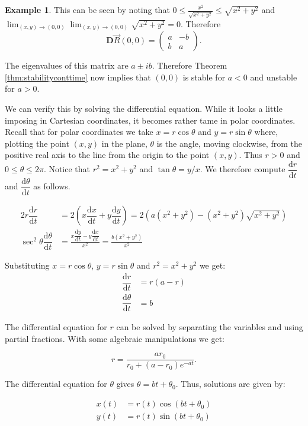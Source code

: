 \documentclass[
  a4paper,
  oneside,
  final]{krantz}
\renewcommand{\d}{\mathrm{d}}
\newcommand{\der}[2]{\dfrac{\d #1}{\d #2}}
\newcommand{\jacobr}{\mathbf{D}\vec{R}}
\theoremstyle{definition}
\theoremstyle{definition}
\newtheorem{example}{Example}[chapter]
\theoremstyle{definition}
\theoremstyle{definition}
\theoremstyle{remark}
\begin{document}
\begin{example}
This can be seen by noting that \(0 \le \frac{x^2}{\sqrt{x^2 + y^2}} \le \sqrt{x^2 + y^2}\) and \(\lim_{(x,y) \to (0,0)} \lim_{(x,y) \to (0,0)} \sqrt{x^2 + y^2} = 0\). Therefore \[
\jacobr(0,0) = \begin{pmatrix} a   & -b \\ b  & a \end{pmatrix}
.\]

The eigenvalues of this matrix are \(a \pm i b\). Therefore Theorem \ref{thm:stabilityconttime} now implies that \((0,0)\) is stable for \(a < 0\) and unstable for \(a >0\).

We can verify this by solving the differential equation. While it looks a little imposing in Cartesian coordinates, it becomes rather tame in polar coordinates. Recall that for polar coordinates we take \(x = r \cos \theta\) and \(y= r \sin \theta\) where, plotting the point \((x,y)\) in the plane, \(\theta\) is the angle, moving clockwise, from the positive real axis to the line from the origin to the point \((x,y)\). Thus \(r>0\) and \(0 \le \theta \le 2 \pi\). Notice that \(r^2 = x^2 + y^2\) and \(\tan \theta = y/x\). We therefore compute \(\der{r}{t}\) and \(\der{\theta}{t}\) as follows.

\begin{align*}
2r\der{r}{t} &= 2\left(x \der{x}{t} + y \der{y}{t}\right) = 2\left(a(x^2 + y^2) - (x^2 + y^2)\sqrt{x^2 + y^2}\right)\\
\sec^2 \theta \der{\theta}{t} &= \frac{x \der{y}{t} - y \der{x}{t}}{x^2} = \frac{b(x^2 + y^2)}{x^2}
\end{align*}

Substituting \(x = r \cos \theta\), \(y= r \sin \theta\) and \(r^2 = x^2 + y^2\) we get: \begin{align*}
 \der{r}{t} &= r (a - r) \\
\der{\theta}{t} &=  b
\end{align*}

The differential equation for \(r\) can be solved by separating the variables and using partial fractions. With some algebraic manipulations we get:

\[ r =  \frac{a r_0}{r_0 + (a-r_0)e^{-at}}.\]

The differential equation for \(\theta\) gives \(\theta = b t + \theta_0\). Thus, solutions are given by:

\begin{align*}
x(t) &= r(t) \cos(bt + \theta_0) \\
y(t) &=  r(t) \sin(bt + \theta_0)
\end{align*}


\end{example}
\end{document}
